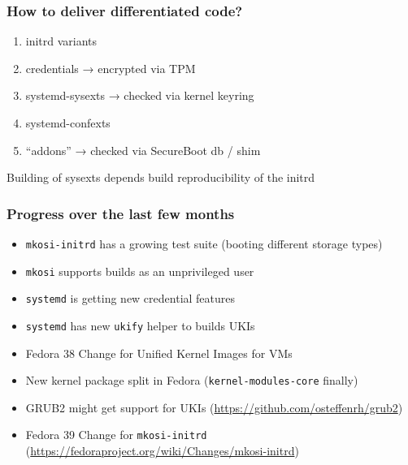 \documentclass[]{beamer}
\newcommand\pp{}
\begin{document}
\begin{frame}
  \frametitle{How to deliver differentiated code?}
  \pp

  \begin{enumerate}
  \item initrd variants\pp
  \item credentials → encrypted via TPM\pp
  \item systemd-sysexts → checked via kernel keyring
  \item systemd-confexts\pp
  \item ``addons'' → checked via SecureBoot db / shim
  \end{enumerate}

  \vfill

  \pp
  Building of sysexts depends build reproducibility of the initrd
\end{frame}

\begin{frame}
  \frametitle{Progress over the last few months}

  \begin{itemize}
  \item \texttt{mkosi-initrd} has a growing test suite (booting different storage types)
  \item \texttt{mkosi} supports builds as an unprivileged user
  \item \texttt{systemd} is getting new credential features
  \item \texttt{systemd} has new \texttt{ukify} helper to builds UKIs
  \item Fedora 38 Change for Unified Kernel Images for VMs
  \item New kernel package split in Fedora (\texttt{kernel-modules-core} finally)
  \item GRUB2 might get support for UKIs (\url{https://github.com/osteffenrh/grub2})
  \item Fedora 39 Change for \texttt{mkosi-initrd}
        (\small\url{https://fedoraproject.org/wiki/Changes/mkosi-initrd})
  \end{itemize}
\end{frame}
\end{document}
